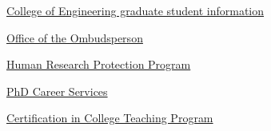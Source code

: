 \vspace{2mm}
\noindent
\href{https://www.egr.msu.edu/academics/graduate/current-students}{College
  of Engineering graduate student information}

\vspace{2mm}
\noindent
\href{http://www.msu.edu/unit/ombud/}{Office of the Ombudsperson}

\vspace{2mm}
\noindent
\href{http://hrpp.msu.edu/}{Human Research Protection Program}

\vspace{2mm}
\noindent
\href{https://grad.msu.edu/phdcareers}{PhD Career Services}

\vspace{2mm}
\noindent
\href{https://www.egr.msu.edu/academics/graduate/certification-in-college-teaching-program}{Certification
in College Teaching Program}